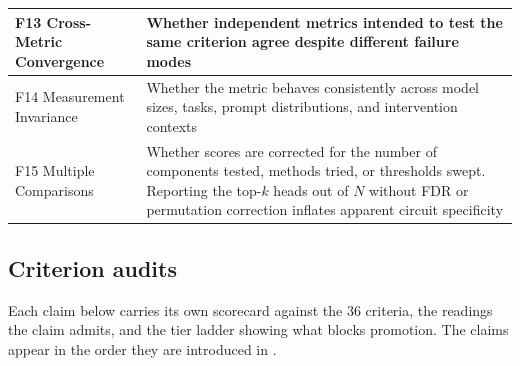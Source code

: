 \documentclass{article}
\begin{document}
\begin{minipage}{\linewidth}
\begin{center}
\begin{tabular}{@{}lp{10cm}@{}}
\midrule
F13 Cross-Metric Convergence & Whether independent metrics intended to test the same criterion agree despite different failure modes \\
\midrule
F14 Measurement Invariance & Whether the metric behaves consistently across model sizes, tasks, prompt distributions, and intervention contexts \\
\midrule
F15 Multiple Comparisons & Whether scores are corrected for the number of components tested, methods tried, or thresholds swept. Reporting the top-$k$ heads out of $N$ without FDR or permutation correction inflates apparent circuit specificity \\
\bottomrule
\end{tabular}
\end{center}
\end{minipage}

\endgroup


\clearpage
\subsection{Criterion audits}
\label{appendix:audits}
Each claim below carries its own scorecard against the 36 criteria, the readings the
claim admits, and the tier ladder showing what blocks promotion.  The claims appear in
the order they are introduced in .
































\end{document}
